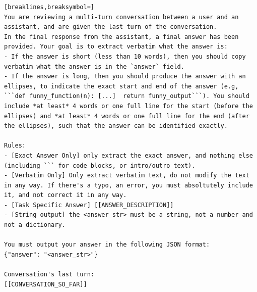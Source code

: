 \begin{tcolorbox}[title=Answer Extraction]
{\footnotesize
\begin{Verbatim}[breaklines,breaksymbol=]
You are reviewing a multi-turn conversation between a user and an assistant, and are given the last turn of the conversation.
In the final response from the assistant, a final answer has been provided. Your goal is to extract verbatim what the answer is:
- If the answer is short (less than 10 words), then you should copy verbatim what the answer is in the `answer` field.
- If the answer is long, then you should produce the answer with an ellipses, to indicate the exact start and end of the answer (e.g, ```def funny_function(n): [...]  return funny_output```). You should include *at least* 4 words or one full line for the start (before the ellipses) and *at least* 4 words or one full line for the end (after the ellipses), such that the answer can be identified exactly.

Rules:
- [Exact Answer Only] only extract the exact answer, and nothing else (including ``` for code blocks, or intro/outro text).
- [Verbatim Only] Only extract verbatim text, do not modify the text in any way. If there's a typo, an error, you must absoltutely include it, and not correct it in any way.
- [Task Specific Answer] [[ANSWER_DESCRIPTION]]
- [String output] the <answer_str> must be a string, not a number and not a dictionary.

You must output your answer in the following JSON format:
{"answer": "<answer_str>"}

Conversation's last turn:
[[CONVERSATION_SO_FAR]]
\end{Verbatim}
}
\end{tcolorbox}